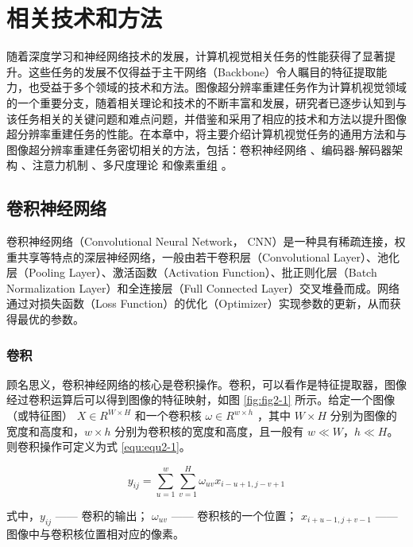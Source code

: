 \chapter{相关技术和方法}

随着深度学习和神经网络技术的发展，计算机视觉相关任务的性能获得了显著提升。这些任务的发展不仅得益于主干网络（Backbone）令人瞩目的特征提取能力，也受益于多个领域的技术和方法。图像超分辨率重建任务作为计算机视觉领域的一个重要分支，随着相关理论和技术的不断丰富和发展，研究者已逐步认知到与该任务相关的关键问题和难点问题，并借鉴和采用了相应的技术和方法以提升图像超分辨率重建任务的性能。在本章中，将主要介绍计算机视觉任务的通用方法和与图像超分辨率重建任务密切相关的方法，包括：卷积神经网络 \cite{qiu2020nndl}、编码器-解码器架构 \cite{DBLP:conf/eccv/NewellYD16}、注意力机制 \cite{DBLP:conf/eccv/WooPLK18}、多尺度理论 \cite{DBLP:journals/tip/YeSWYXLL20} 和像素重组 \cite{DBLP:conf/cvpr/ShiCHTABRW16}。

\section{卷积神经网络}
卷积神经网络（Convolutional Neural Network， CNN）是一种具有稀疏连接，权重共享等特点的深层神经网络，一般由若干卷积层（Convolutional Layer）、池化层（Pooling Layer）、激活函数（Activation Function）、批正则化层（Batch Normalization Layer）和全连接层（Full Connected Layer）交叉堆叠而成。网络通过对损失函数（Loss Function）的优化（Optimizer）实现参数的更新，从而获得最优的参数。

\subsection{卷积}

顾名思义，卷积神经网络的核心是卷积操作。卷积，可以看作是特征提取器，图像经过卷积运算后可以得到图像的特征映射，如图 \ref{fig:fig2-1} 所示。给定一个图像（或特征图） $X\in R^{W\times H}$ 和一个卷积核 $\omega\in R^{w\times h}$ ，其中 $W\times H$ 分别为图像的宽度和高度和，$w\times h$ 分别为卷积核的宽度和高度，且一般有 $w\ll W$，$h\ll H$。则卷积操作可定义为式 \ref{equ:equ2-1}。

\begin{equation}
	y_{ij}=\sum_{u=1}^{w}\sum_{v=1}^{H}\omega_{uv}x_{i-u+1,j-v+1}
	\label{equ:equ2-1}
\end{equation}

\noindent 式中，$y_{ij}$ —— 卷积的输出；\newline
\indent\quad $\omega_{uv}$ —— 卷积核的一个位置；\newline
\indent\quad $x_{i+u-1,j+v-1}$ —— 图像中与卷积核位置相对应的像素。

